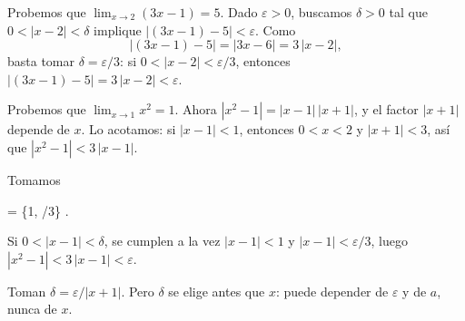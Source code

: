 %

\begin{frame}

\begin{example}
Probemos que $\lim_{x \to 2} (3x - 1) = 5$. Dado $\varepsilon > 0$, buscamos
$\delta > 0$ tal que $0 < |x - 2| < \delta$ implique
$|(3x - 1) - 5| < \varepsilon$. Como
\[
  |(3x - 1) - 5| = |3x - 6| = 3\,|x - 2| ,
\]
basta tomar $\delta = \varepsilon / 3$: si $0 < |x - 2| < \varepsilon/3$,
entonces $|(3x - 1) - 5| = 3\,|x - 2| < \varepsilon$.
\end{example}

\end{frame}

\begin{frame}

\begin{example}
Probemos que $\lim_{x \to 1} x^2 = 1$. Ahora
$|x^2 - 1| = |x - 1|\,|x + 1|$, y el factor $|x + 1|$ depende de $x$. Lo acotamos: si $|x - 1| < 1$, entonces
$0 < x < 2$ y $|x + 1| < 3$, así que $|x^2 - 1| < 3\,|x - 1|$.

\dpause

Tomamos
\begin{keyformula}
  \delta = \min\{1, \varepsilon/3\} .
\end{keyformula}
Si $0 < |x - 1| < \delta$, se cumplen a la vez $|x - 1| < 1$ y
$|x - 1| < \varepsilon/3$, luego $|x^2 - 1| < 3\,|x - 1| < \varepsilon$.
\end{example}

\begin{commonmistake}
Toman $\delta = \varepsilon / |x + 1|$. Pero $\delta$ se elige antes que $x$:
puede depender de $\varepsilon$ y de $a$, nunca de $x$.
\end{commonmistake}
\end{frame}
